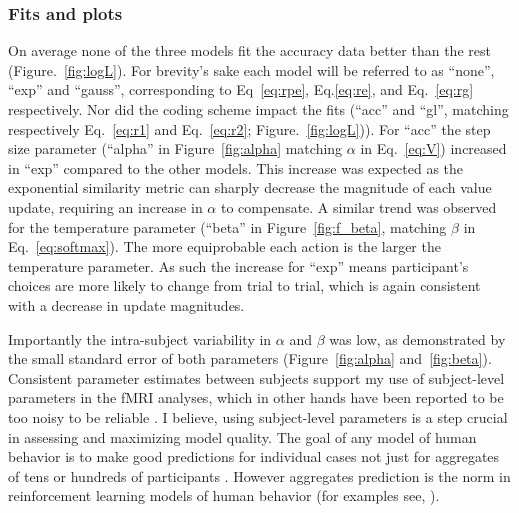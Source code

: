 \documentclass[doc,12pt]{apa}        %
\begin{document}
\subsubsection{Fits and plots}
\label{subsub:fits}
On average none of the three models fit the accuracy data better than the rest (Figure.~\ref{fig:logL}).  For brevity's sake each model will be referred to as ``none'', ``exp'' and ``gauss'', corresponding to Eq~\ref{eq:rpe}, Eq.\ref{eq:re}, and Eq.~\ref{eq:rg} respectively.  Nor did the coding scheme impact the fits (``acc'' and ``gl'', matching respectively Eq.~\ref{eq:r1} and Eq.~\ref{eq:r2}; Figure.~\ref{fig:logL})).  For ``acc'' the step size parameter (``alpha'' in Figure~\ref{fig:alpha} matching $\alpha$ in Eq.~\ref{eq:V}) increased in ``exp'' compared to the other models.  This increase was expected as the exponential similarity metric can sharply decrease the magnitude of each value update, requiring an increase in $\alpha$ to compensate.  A similar trend was observed for the temperature parameter (``beta'' in Figure~\ref{fig:f_beta}, matching $\beta$ in Eq.~\ref{eq:softmax}). The more equiprobable each action is the larger the temperature parameter.  As such the increase for ``exp'' means participant's choices are more likely to change from trial to trial, which is again consistent with a decrease in update magnitudes.

Importantly the intra-subject variability in $\alpha$ and $\beta$ was low, as demonstrated by the small standard error of both parameters (Figure~\ref{fig:alpha} and~\ref{fig:beta}).  Consistent parameter estimates between subjects support my use of subject-level parameters in the fMRI analyses, which in other hands have been reported to be too noisy to be reliable \cite{Daw:2011p7995,Seymour:2007p7585,ODoherty:2003p6329}.  I believe, using subject-level parameters is a step crucial in assessing and maximizing model quality. The goal of any model of human behavior is to make good predictions for individual cases not just for aggregates of tens or hundreds of participants \cite{Daw:2007p9346}.  However aggregates prediction is the norm in reinforcement learning models of human behavior (for examples see, ).
\end{document}
